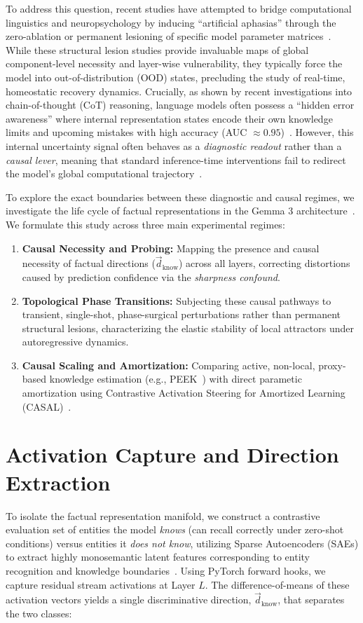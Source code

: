 \documentclass[11pt,a4paper,oneside]{scrbook}
\begin{document}
To address this question, recent studies have attempted to bridge computational linguistics and neuropsychology by inducing ``artificial aphasias'' through the zero-ablation or permanent lesioning of specific model parameter matrices~\cite{roll2026artificial}. While these structural lesion studies provide invaluable maps of global component-level necessity and layer-wise vulnerability, they typically force the model into out-of-distribution (OOD) states, precluding the study of real-time, homeostatic recovery dynamics. Crucially, as shown by recent investigations into chain-of-thought (CoT) reasoning, language models often possess a ``hidden error awareness'' where internal representation states encode their own knowledge limits and upcoming mistakes with high accuracy (AUC $\approx 0.95$)~\cite{yuan2026hidden}. However, this internal uncertainty signal often behaves as a \textit{diagnostic readout} rather than a \textit{causal lever}, meaning that standard inference-time interventions fail to redirect the model's global computational trajectory~\cite{yuan2026hidden}.

To explore the exact boundaries between these diagnostic and causal regimes, we investigate the life cycle of factual representations in the Gemma 3 architecture~\cite{deepmind2026gemma3}. We formulate this study across three main experimental regimes:
\begin{enumerate}
    \item \textbf{Causal Necessity and Probing:} Mapping the presence and causal necessity of factual directions ($\vec{d}_{\text{know}}$) across all layers, correcting distortions caused by prediction confidence via the \textit{sharpness confound}.
    \item \textbf{Topological Phase Transitions:} Subjecting these causal pathways to transient, single-shot, phase-surgical perturbations rather than permanent structural lesions, characterizing the elastic stability of local attractors under autoregressive dynamics.
    \item \textbf{Causal Scaling and Amortization:} Comparing active, non-local, proxy-based knowledge estimation (e.g., PEEK~\cite{sharma2025efficient}) with direct parametic amortization using Contrastive Activation Steering for Amortized Learning (CASAL)~\cite{yang2025hallucination}.
\end{enumerate}

\chapter{Activation Capture and Direction Extraction}
\label{sec:activation_capture}
To isolate the factual representation manifold, we construct a contrastive evaluation set of entities the model \textit{knows} (can recall correctly under zero-shot conditions) versus entities it \textit{does not know}, utilizing Sparse Autoencoders (SAEs) to extract highly monosemantic latent features corresponding to entity recognition and knowledge boundaries~\cite{ferrando2025do}. Using PyTorch forward hooks, we capture residual stream activations at Layer $L$. The difference-of-means of these activation vectors yields a single discriminative direction, $\vec{d}_{\text{know}}$, that separates the two classes:
\end{document}

